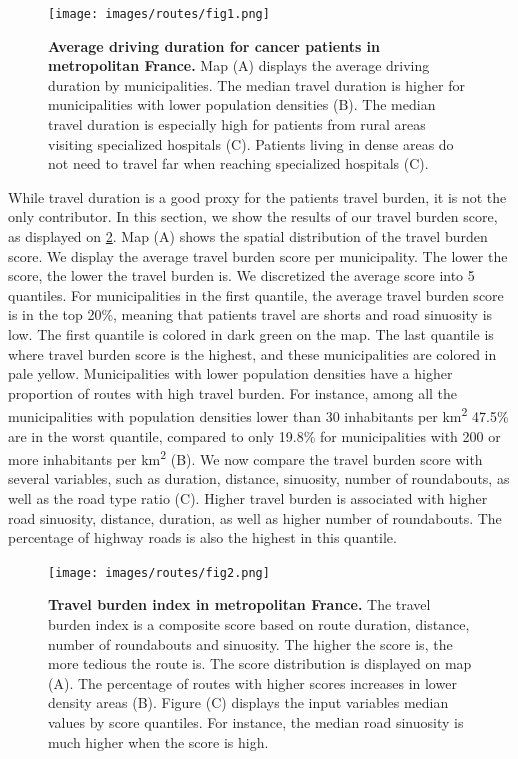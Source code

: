 \begin{figure}[H]
    \texttt{[image: images/routes/fig1.png]}
    \centering
    \caption{
        \textbf{Average driving duration for cancer patients in metropolitan France.} Map (A) displays the average driving duration by municipalities. The median travel duration is higher for municipalities with lower population densities (B). The median travel duration is especially high for patients from rural areas visiting specialized hospitals (C). Patients living in dense areas do not need to travel far when reaching specialized hospitals (C).
    }
    \label{fig:routes-duration-france}
\end{figure}

While travel duration is a good proxy for the patients travel burden, it is not the only contributor. In this section, we show the results of our travel burden score, as displayed on \cref{fig:routes-burden-index}. Map (A) shows the spatial distribution of the travel burden score. We display the average travel burden score per municipality. The lower the score, the lower the travel burden is. We discretized the average score into 5 quantiles. For municipalities in the first quantile, the average travel burden score is in the top 20\%, meaning that patients travel are shorts and road sinuosity is low. The first quantile is colored in dark green on the map. The last quantile is where travel burden score is the highest, and these municipalities are colored in pale yellow. Municipalities with lower population densities have a higher proportion of routes with high travel burden. For instance, among all the municipalities with population densities lower than 30 inhabitants per km\textsuperscript{2} 47.5\% are in the worst quantile, compared to only 19.8\% for municipalities with 200 or more inhabitants per km\textsuperscript{2} (B). We now compare the travel burden score with several variables, such as duration, distance, sinuosity, number of roundabouts, as well as the road type ratio (C). Higher travel burden is associated with higher road sinuosity, distance, duration, as well as higher number of roundabouts. The percentage of highway roads is also the highest in this quantile.

\begin{figure}[H]
    \texttt{[image: images/routes/fig2.png]}
    \centering
    \caption{
        \textbf{Travel burden index in metropolitan France.} The travel burden index is a composite score based on route duration, distance, number of roundabouts and sinuosity. The higher the score is, the more tedious the route is. The score distribution is displayed on map (A). The percentage of routes with higher scores increases in lower density areas (B). Figure (C) displays the input variables median values by score quantiles. For instance, the median road sinuosity is much higher when the score is high.
    }
    \label{fig:routes-burden-index}
\end{figure}

